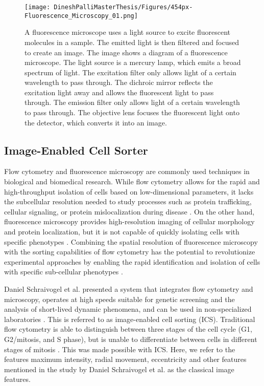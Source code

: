 \documentclass[12pt,a4paper]{article}
\begin{document}
\begin{figure}
  \centering
  \texttt{[image: DineshPalliMasterThesis/Figures/454px-Fluorescence\_Microscopy\_01.png]}
  \caption[Working principle of fluorescence microscopy]{A fluorescence microscope uses a light source to excite fluorescent molecules in a sample. The emitted light is then filtered and focused to create an image. The image shows a diagram of a fluorescence microscope. The light source is a mercury lamp, which emits a broad spectrum of light. The excitation filter only allows light of a certain wavelength to pass through. The dichroic mirror reflects the excitation light away and allows the fluorescent light to pass through. The emission filter only allows light of a certain wavelength to pass through. The objective lens focuses the fluorescent light onto the detector, which converts it into an image. \cite{File:Fluorescence Microscopy 01.png - Biology Wiki}}
  \label{fluorescencemicroscopy}
\end{figure}


\subsection{Image-Enabled Cell Sorter}
Flow cytometry and fluorescence microscopy are commonly used techniques in biological and biomedical research. While flow cytometry allows for the rapid and high-throughput isolation of cells based on low-dimensional parameters, it lacks the subcellular resolution needed to study processes such as protein trafficking, cellular signaling, or protein mislocalization during disease \cite{cossarizza_chang_radbruch_acs_adam_adamklages_agace_aghaeepour_akdis_allez_et_al._2019}. On the other hand, fluorescence microscopy provides high-resolution imaging of cellular morphology and protein localization, but it is not capable of quickly isolating cells with specific phenotypes \cite{Espina2006-iv}. Combining the spatial resolution of fluorescence microscopy with the sorting capabilities of flow cytometry has the potential to revolutionize experimental approaches by enabling the rapid identification and isolation of cells with specific sub-cellular phenotypes \cite{doi:10.1126/science.abj3013}.

Daniel Schraivogel et al. presented a system that integrates flow cytometry and microscopy, operates at high speeds suitable for genetic screening and the analysis of short-lived dynamic phenomena, and can be used in non-specialized laboratories \cite{doi:10.1126/science.abj3013}. This is referred to as image-enabled cell sorting (ICS). Traditional flow cytometry is able to distinguish between three stages of the cell cycle (G1, G2/mitosis, and S phase), but is unable to differentiate between cells in different stages of mitosis \cite{doi:10.1126/science.abj3013}. This was made possible with ICS. Here, we refer to the features maximum intensity, radial movement, eccentricity and other features mentioned in the study by Daniel Schraivogel et al. as the classical image features.
\end{document}
